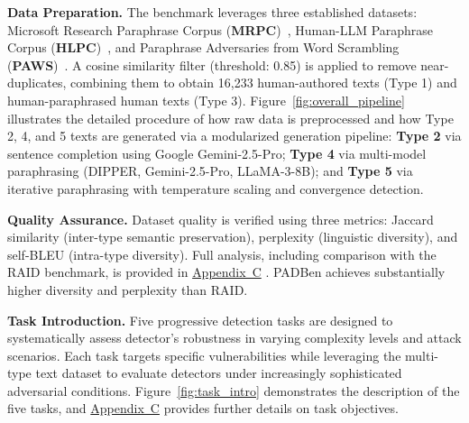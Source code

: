 \documentclass[runningheads]{llncs}
\newcommand{\appref}[1]{%
  \href{https://github.com/JonathanZha47/PadBen-Paraphrase-Attack-Benchmark/blob/main/docs/padben_icann_appendix.pdf}{Appendix~#1}%
}
\begin{document}
\noindent\textbf{Data Preparation.}
The benchmark leverages three established datasets: Microsoft Research 
Paraphrase Corpus (\textbf{MRPC})~\cite{dolan2005automatically}, 
Human-LLM Paraphrase Corpus (\textbf{HLPC})~\cite{lau2024hlpc}, and 
Paraphrase Adversaries from Word Scrambling 
(\textbf{PAWS})~\cite{paws2019naacl}. A cosine similarity filter 
(threshold: 0.85) is applied to remove near-duplicates, combining them 
to obtain 16,233 human-authored texts (Type 1) and human-paraphrased 
human texts (Type 3). Figure~\ref{fig:overall_pipeline} illustrates 
the detailed procedure of how raw data is preprocessed and how Type 2, 
4, and 5 texts are generated via a modularized generation pipeline: 
\textbf{Type 2} via sentence completion using Google Gemini-2.5-Pro; 
\textbf{Type 4} via multi-model paraphrasing (DIPPER, Gemini-2.5-Pro, 
LLaMA-3-8B); and \textbf{Type 5} via iterative paraphrasing with 
temperature scaling and convergence detection.

\noindent\textbf{Quality Assurance.}
Dataset quality is verified using three metrics: Jaccard 
similarity (inter-type semantic preservation), perplexity (linguistic 
diversity), and self-BLEU (intra-type diversity). Full analysis, 
including comparison with the RAID benchmark, is provided in 
\appref{C}. PADBen achieves substantially higher 
diversity and perplexity than RAID.

\noindent\textbf{Task Introduction.}
Five progressive detection tasks are designed to systematically assess 
detector's robustness in varying complexity levels and attack 
scenarios. Each task targets specific vulnerabilities while leveraging 
the multi-type text dataset to evaluate detectors under increasingly 
sophisticated adversarial conditions. Figure~\ref{fig:task_intro} 
demonstrates the description of the five tasks, and 
\appref{C} provides further details on task 
objectives.
\end{document}
